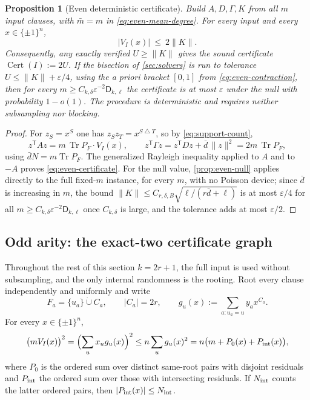 \documentclass[11pt]{article}
\newtheorem{proposition}[proposition]{Proposition}
\theoremstyle{definition}
\theoremstyle{remark}
\newcommand{\1}{\mathbf 1}
\newcommand{\sd}{\mathbin{\triangle}}
\newcommand{\bd}{\bar d}
\newcommand{\eps}{\varepsilon}
\newcommand{\Dkl}{\mathsf D_{k,\ell}}
\DeclareMathOperator{\Tr}{Tr}
\DeclareMathOperator{\Cert}{Cert}
\numberwithin{equation}{section}
\begin{document}
\begin{proposition}[Even deterministic certificate]\label{prop:even-certificate}
Build $A,D,\Gamma,K$ from \emph{all} $m$ input clauses, with
$\bar m=m$ in \cref{eq:even-mean-degree}.  For every input and every
$x\in\{\pm1\}^n$,
\begin{equation}\label{eq:even-certificate}
 |V_I(x)|\ \le\ 2\|K\| .
\end{equation}
Consequently, any exactly verified $U\ge\|K\|$ gives the sound
certificate $\Cert(I):=2U$.  If the bisection of \cref{sec:solvers} is
run to tolerance $U\le\|K\|+\eps/4$, using the a priori bracket
$[0,1]$ from \cref{eq:even-contraction}, then for every
$m\ge C_{k,\delta}\eps^{-2}\Dkl$ the certificate is at most
$\eps$ under the null with probability $1-o(1)$.  The procedure is
deterministic and requires neither subsampling nor blocking.
\end{proposition}
\begin{proof}
For $z_S=x^S$ one has $z_Sz_T=x^{S\sd T}$, so by
\cref{eq:support-count},
\[
 z^{\mathsf T}Az=m\,\Tr P_F\cdot V_I(x),
 \qquad
 z^{\mathsf T}\Gamma z=z^{\mathsf T}Dz+\bd\,\|z\|^2
 =2m\,\Tr P_F,
\]
using $\bd N=m\Tr P_F$.  The generalized Rayleigh inequality applied to
$A$ and to $-A$ proves \cref{eq:even-certificate}.  For the null value,
\cref{prop:even-null} applies directly to the full fixed-$m$ instance,
for every $m$, with no Poisson device; since $\bd$ is increasing in $m$,
the bound $\|K\|\le C_{r,\delta,B}\sqrt{\ell/(r\bd+\ell)}$ is at most
$\eps/4$ for all $m\ge C_{k,\delta}\eps^{-2}\Dkl$ once
$C_{k,\delta}$ is large, and the tolerance adds at most $\eps/2$.
\end{proof}

\subsection{Odd arity: the exact-two certificate graph}
\label{sec:oddref-construction}

Throughout the rest of this section $k=2r+1$, the full input is used
without subsampling, and the only internal randomness is the rooting.
Root every clause independently and uniformly and write
\[
 F_a=\{u_a\}\mathbin{\dot\cup}C_a,
 \qquad |C_a|=2r,
 \qquad
 g_u(x):=\sum_{a:u_a=u}y_ax^{C_a}.
\]
For every $x\in\{\pm1\}^n$,
\begin{equation}\label{eq:odd-cauchy}
 \bigl(mV_I(x)\bigr)^2
 =\Bigl(\sum_ux_ug_u(x)\Bigr)^2
 \le n\sum_ug_u(x)^2
 =n\bigl(m+P_0(x)+P_{\rm int}(x)\bigr),
\end{equation}
where $P_0$ is the ordered sum over distinct same-root pairs with disjoint
residuals and $P_{\rm int}$ the ordered sum over those with intersecting
residuals.  If $N_{\rm int}$ counts the latter ordered pairs, then
$|P_{\rm int}(x)|\le N_{\rm int}$.
\end{document}
